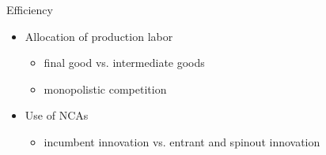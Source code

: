 \documentclass[english,usenames,dvipsnames]{beamer}
\begin{document}
\begin{frame}{Efficiency}\label{efficiency} 
	\hyperlink{reducing_kappa_c_table}{}
	\medskip
	\begin{itemize}
		\item Allocation of production labor
		\begin{itemize}
			\item final good vs. intermediate goods
			\item monopolistic competition
		\end{itemize}
		\medskip
		\item Use of NCAs 
		\begin{itemize}
			\item incumbent innovation vs. entrant and spinout innovation  \hyperlink{misallocation_of_nca}{} 
		\end{itemize}
	\end{itemize}
\end{frame}
\end{document}
